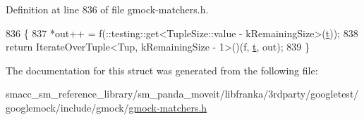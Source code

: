 Definition at line 836 of file gmock-\/matchers.\+h.


\begin{DoxyCode}
836                                                                  \{
837       *out++ = f(::testing::get<TupleSize::value - kRemainingSize>(\hyperlink{namespacebattery__monitor__node_a7a63d20d1ea461e280f4eb5b47f925cd}{t}));
838       \textcolor{keywordflow}{return} IterateOverTuple<Tup, kRemainingSize - 1>()(f, \hyperlink{namespacebattery__monitor__node_a7a63d20d1ea461e280f4eb5b47f925cd}{t}, out);
839     \}
\end{DoxyCode}


The documentation for this struct was generated from the following file\+:\begin{DoxyCompactItemize}
\item 
smacc\+\_\+sm\+\_\+reference\+\_\+library/sm\+\_\+panda\+\_\+moveit/libfranka/3rdparty/googletest/googlemock/include/gmock/\hyperlink{gmock-matchers_8h}{gmock-\/matchers.\+h}\end{DoxyCompactItemize}
